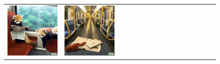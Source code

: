 \begin{figure}[ht!]
\begin{adjustwidth}{-0.8in}{-0.5in}
\begin{tabular}{cccccccccccccccccccc}
\multicolumn{3}{c}{\includegraphics[width=\twobytwocolwidth\textwidth]{figures/cherries/red_pandas_jungle.jpg}} &
\multicolumn{3}{c}{\includegraphics[width=\twobytwocolwidth\textwidth]{figures/cherries/lobster_ocean.jpg}} &&

\end{tabular}
\end{adjustwidth}
\end{figure}
